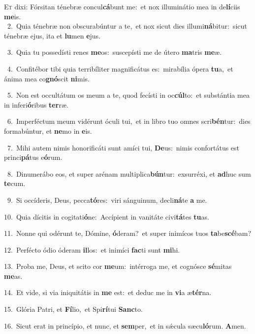 \lettrine{\initial\textcolor{\initialcolor}{E}}{t} dixi: Fórsitan ténebræ concul\-\textbf{cá}\-bunt me:~\star et nox illuminátio mea in de\-\textbf{lí}\-ciis \textbf{me}\-is.\\
{\numbfont\textcolor{\numbcolor}{~2.}}~Quia ténebræ non obscurabúntur a te,~\dagger et nox sicut dies illumi\-\textbf{ná}\-bitur:~\star sicut ténebræ ejus, ita et \textbf{lu}\-men \textbf{e}\-jus.\par
{\numbfont\textcolor{\numbcolor}{~3.}}~Quia tu possedísti renes \textbf{me}\-os:~\star suscepísti me de útero \textbf{ma}\-tris \textbf{me}\-æ.\par
{\numbfont\textcolor{\numbcolor}{~4.}}~Confitébor tibi quia terribíliter magnificátus es:~\dagger mirabília ópera \textbf{tu}\-a,~\star et ánima mea co\-\textbf{gnó}\-scit \textbf{ni}\-mis.\par
{\numbfont\textcolor{\numbcolor}{~5.}}~Non est occultátum os meum a te, quod fecísti in oc\-\textbf{cúl}\-to:~\star et substántia mea in inferi\-\textbf{ó}\-ribus \textbf{ter}\-ræ.\par
{\numbfont\textcolor{\numbcolor}{~6.}}~Imperféctum meum vidérunt óculi tui,~\dagger et in libro tuo omnes scri\-\textbf{bén}\-tur:~\star dies formabúntur, et \textbf{ne}\-mo in \textbf{e}\-is.\par
{\numbfont\textcolor{\numbcolor}{~7.}}~Mihi autem nimis honorificáti sunt amíci tui, \textbf{De}\-us:~\star nimis confortátus est princi\-\textbf{pá}\-tus e\-\textbf{ó}\-rum.\par
{\numbfont\textcolor{\numbcolor}{~8.}}~Dinumerábo eos, et super arénam multiplica\-\textbf{bún}\-tur:~\star exsurréxi, et \textbf{ad}\-huc sum \textbf{te}\-cum.\par
{\numbfont\textcolor{\numbcolor}{~9.}}~Si occíderis, Deus, pecca\-\textbf{tó}\-res:~\star viri sánguinum, decli\-\textbf{ná}\-te \textbf{a} me.\par
{\numbfont\textcolor{\numbcolor}{10.}}~Quia dícitis in cogitati\-\textbf{ó}\-ne:~\star Accípient in vanitáte civi\-\textbf{tá}\-tes \textbf{tu}\-as.\par
{\numbfont\textcolor{\numbcolor}{11.}}~Nonne qui odérunt te, Dómine, \textbf{ó}\-deram?~\star et super inimícos tuos \textbf{ta}\-be\-\textbf{scé}\-bam?\par
{\numbfont\textcolor{\numbcolor}{12.}}~Perfécto ódio óderam \textbf{il}\-los:~\star et inimíci \textbf{fac}\-ti sunt \textbf{mi}\-hi.\par
{\numbfont\textcolor{\numbcolor}{13.}}~Proba me, Deus, et scito cor \textbf{me}\-um:~\star intérroga me, et cognósce \textbf{sé}\-mitas \textbf{me}\-as.\par
{\numbfont\textcolor{\numbcolor}{14.}}~Et vide, si via iniquitátis in \textbf{me} est:~\star et deduc me in \textbf{vi}\-a æ\-\textbf{tér}\-na.\par
{\numbfont\textcolor{\numbcolor}{15.}}~Glória Patri, et \textbf{Fí}\-lio,~\star et Spi\-\textbf{rí}\-tui \textbf{Sanc}\-to.\par
{\numbfont\textcolor{\numbcolor}{16.}}~Sicut erat in princípio, et nunc, et \textbf{sem}\-per,~\star et in sǽcula sæcu\-\textbf{ló}\-rum. \textbf{A}\-men.\par
